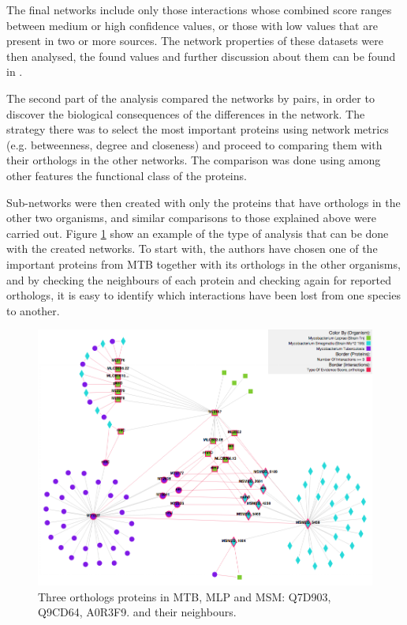 The final networks include only those interactions whose combined score ranges between medium or high confidence values, or those with low values that are present in two or more sources.  The network properties of these datasets were then analysed, the found values and further discussion about them can be found in \cite{AKI2013}.

The second part of the analysis compared the networks by pairs, in order to discover the biological consequences of the differences in the network. The strategy there was to select the most important proteins using network metrics (e.g. betweenness, degree and closeness) and proceed to comparing them with their orthologs in the other networks. The comparison was done using among other features the functional class of the proteins. 

Sub-networks were then created with only the proteins that have orthologs in the other two organisms, and similar comparisons to those explained above were carried out. Figure \ref{fig:pinv_orthologs} show an example of the type of analysis that can be done with the created networks. To start with, the authors have chosen one of the important proteins from MTB together with its orthologs in the other organisms, and by checking the neighbours of each protein and checking again for reported orthologs, it is easy to identify which interactions have been lost from one species to another.

\begin{figure}
\centering
\includegraphics[width=\textwidth]{figures/pinv_orthologs.png}
\caption[Three orthologs proteins in MTB, MLP and MSM]{Three orthologs proteins in MTB, MLP and MSM: Q7D903, Q9CD64, A0R3F9. and their neighbours.
\label{fig:pinv_orthologs}}
\end{figure}

